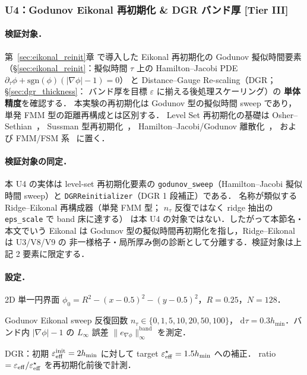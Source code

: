 %
\subsubsection{U4：Godunov Eikonal 再初期化 \& DGR バンド厚 [Tier III]}
\label{sec:U4_ridge_eikonal_reinit}

\paragraph{検証対象．}
第~\ref{sec:eikonal_reinit}章 で導入した
Eikonal 再初期化の Godunov 擬似時間要素
（§\ref{sec:eikonal_reinit}：擬似時間 $\tau$ 上の
Hamilton--Jacobi PDE $\partial_\tau \phi + \mathrm{sgn}(\phi)(|\nabla\phi|-1) = 0$）
と Distance--Gauge Re-scaling（DGR；§\ref{sec:dgr_thickness}：
バンド厚を目標 $\varepsilon$ に揃える後処理スケーリング）の
\textbf{単体精度}を確認する．
本実験の再初期化は Godunov 型の擬似時間 sweep であり，
単発 FMM 型の距離再構成とは区別する．
Level Set 再初期化の基礎は Osher--Sethian~\cite{OsherSethian1988}，
Sussman 型再初期化~\cite{Sussman1994,Sussman1999}，
Hamilton--Jacobi/Godunov 離散化~\cite{JiangPeng2000,RouyTourin1992}，
および FMM/FSM 系~\cite{Sethian1996,Zhao2005} に置く．

\paragraph{検証対象の同定．}
本 U4 の実体は level-set 再初期化要素の
\texttt{godunov\_sweep}（Hamilton--Jacobi 擬似時間 sweep）と
\texttt{DGRReinitializer}（DGR 1 段補正）である．
名称が類似する Ridge--Eikonal 再構成器（単発 FMM 型；
$n_\tau$ 反復ではなく ridge 抽出の \texttt{eps\_scale} で band 床に達する）
は本 U4 の対象ではない．したがって本節名・本文でいう Eikonal は
Godunov 型の擬似時間再初期化を指し，Ridge--Eikonal は U3/V8/V9 の
非一様格子・局所厚み側の診断として分離する．検証対象は上記 2 要素に限定する．

\paragraph{設定．}
2D 単一円界面 $\phi_0 = R^2 - (x-0.5)^2 - (y-0.5)^2$，$R = 0.25$，$N = 128$．
\begin{description}\setlength{\itemsep}{0pt}
  \item[U4-a] Godunov Eikonal sweep 反復回数 $n_\tau \in \{0,1,5,10,20,50,100\}$，
        $\mathrm{d}\tau = 0.3 h_{\min}$．バンド内 $|\nabla\phi|-1$ の $L_\infty$ 誤差
        $\|e_{\nabla\phi}\|^{\mathrm{band}}_\infty$ を測定．
  \item[U4-b] DGR：初期 $\varepsilon_{\mathrm{eff}}^{\mathrm{init}} = 2 h_{\min}$ に対して
        target $\varepsilon_{\mathrm{eff}}^{\star} = 1.5 h_{\min}$ への補正．
        ratio $= \varepsilon_{\mathrm{eff}} / \varepsilon_{\mathrm{eff}}^{\star}$ を再初期化前後で計測．
\end{description}

